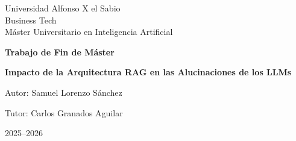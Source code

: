 \documentclass[12pt,a4paper,oneside]{report}
\title{\tfmtitle}
\author{\tfmauthor}
\date{Curso 2024--2025}
\newcommand{\tfmtitle}{Impacto de la Arquitectura RAG en las Alucinaciones de los LLMs}
\newcommand{\tfmauthor}{Samuel Lorenzo Sánchez}
\newcommand{\tfmtutor}{Carlos Granados Aguilar}
\begin{document}
\begin{titlepage}
\centering
{\Large Universidad Alfonso X el Sabio\\Business Tech\\[0.5em]
Máster Universitario en Inteligencia Artificial\par}
\vspace{2.5cm}
{\LARGE\bfseries Trabajo de Fin de Máster\par}
\vspace{1.5cm}
{\Huge\bfseries \tfmtitle\par}
\vspace{2cm}
{\Large Autor: \tfmauthor\par}
\vspace{0.6cm}
{\Large Tutor: \tfmtutor\par}
\vfill
{\large 2025--2026\par}
\end{titlepage}

\tableofcontents
\clearpage
\listoffigures
\listoftables
\clearpage
{}
\end{document}
